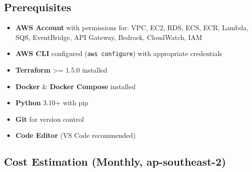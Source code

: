 \hypertarget{prerequisites}{%
\subsection{Prerequisites}}

\begin{itemize}
\tightlist
\item
  \textbf{AWS Account} with permissions for: VPC, EC2, RDS, ECS, ECR,
  Lambda, SQS, EventBridge, API Gateway, Bedrock, CloudWatch, IAM
\item
  \textbf{AWS CLI} configured (\texttt{aws\ configure}) with appropriate
  credentials
\item
  \textbf{Terraform} \textgreater= 1.5.0 installed
\item
  \textbf{Docker} \& \textbf{Docker Compose} installed
\item
  \textbf{Python} 3.10+ with pip
\item
  \textbf{Git} for version control
\item
  \textbf{Code Editor} (VS Code recommended)
\end{itemize}

\hypertarget{cost-estimation-monthly-ap-southeast-2}{%
\subsection{Cost Estimation (Monthly,
ap-southeast-2)}}

